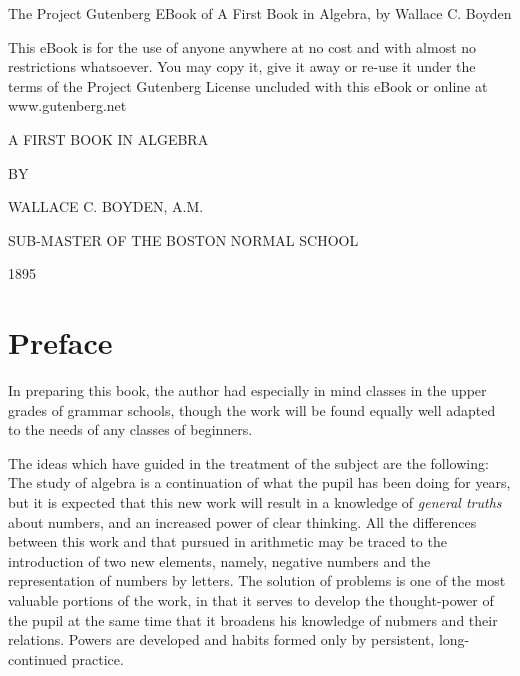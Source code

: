 \documentclass[12pt,oneside]{book}
\begin{document}
    
\frontmatter
\noindent The Project Gutenberg EBook of A First Book in Algebra, by Wallace C. Boyden

\noindent This eBook is for the use of anyone anywhere at no cost and with almost no restrictions whatsoever.
You may copy it, give it away or re-use it under the terms of the Project Gutenberg License uncluded 
with this eBook or online at www.gutenberg.net

\begin{titlepage}
    \centering
    \vspace*{4cm}
    {\Huge A FIRST BOOK IN ALGEBRA\par}
    \vspace{2cm}
    {\large BY\par}
    \vspace{2cm}
    {\LARGE WALLACE C. BOYDEN, A.M.\par}
    \vspace{2cm}
    {\Large SUB-MASTER OF THE BOSTON NORMAL SCHOOL\par}
    \vspace{1cm}
    {\normalsize 1895}
\end{titlepage}

\chapter{Preface}
In preparing this book, the author had especially in mind classes in the upper grades of grammar schools,
though the work will be found equally well adapted to the needs of any classes of beginners. \par 

The ideas which have guided in the treatment of the subject are the following:
The study of algebra is a continuation of what the pupil has been doing for years,
but it is expected that this new work will result in a knowledge of \textit{general truths}
about numbers, and an increased power of clear thinking.
All the differences between this work and that pursued in arithmetic may be traced to the introduction
of two new elements, namely, negative numbers and the representation of numbers by letters.
The solution of problems is one of the most valuable portions of the work, 
in that it serves to develop the thought-power of the pupil at the same time that it broadens 
his knowledge of nubmers and their relations. Powers are developed and habits formed only by persistent, 
long-continued practice. \par 
\end{document}

